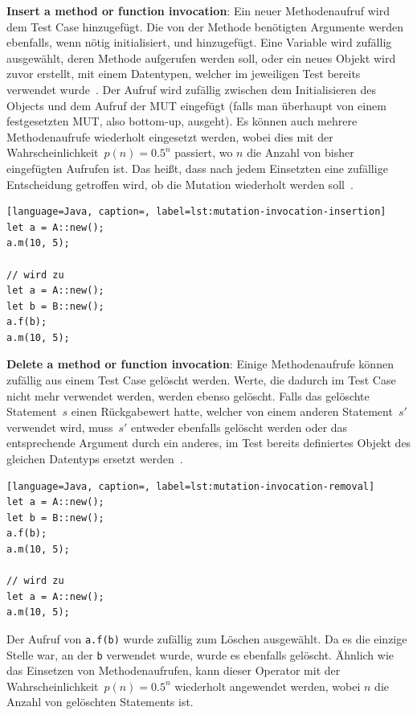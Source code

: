 \documentclass{article}
\begin{document}
\textbf{Insert a method or function invocation}: Ein neuer Methodenaufruf wird dem Test Case hinzugefügt. Die von der Methode benötigten Argumente werden ebenfalls, wenn nötig initialisiert, und hinzugefügt. Eine Variable wird zufällig ausgewählt, deren Methode aufgerufen werden soll, oder ein neues Objekt wird zuvor erstellt, mit einem Datentypen, welcher im jeweiligen Test bereits verwendet wurde~\cite{Fraser2012}. Der Aufruf wird zufällig zwischen dem Initialisieren des Objects und dem Aufruf der \ac{MUT} eingefügt (falls man überhaupt von einem festgesetzten MUT, also bottom-up, ausgeht). Es können auch mehrere Methodenaufrufe wiederholt eingesetzt werden, wobei dies mit der Wahrscheinlichkeit~$p(n) = 0.5^n$ passiert, wo $n$ die Anzahl von bisher eingefügten Aufrufen ist. Das heißt, dass nach jedem Einsetzten eine zufällige Entscheidung getroffen wird, ob die Mutation wiederholt werden soll~\cite{Tonella2004}.
\begin{lstlisting}[language=Java, caption=, label=lst:mutation-invocation-insertion]
let a = A::new();
a.m(10, 5);

// wird zu 
let a = A::new();
let b = B::new();
a.f(b);
a.m(10, 5);
\end{lstlisting}

\textbf{Delete a method or function invocation}: Einige Methodenaufrufe können zufällig aus einem Test Case gelöscht werden. Werte, die dadurch im Test Case nicht mehr verwendet werden, werden ebenso gelöscht. Falls das gelöschte Statement~$s$ einen Rückgabewert hatte, welcher von einem anderen Statement~$s'$ verwendet wird, muss~$s'$ entweder ebenfalls gelöscht werden oder das entsprechende Argument durch ein anderes, im Test bereits definiertes Objekt des gleichen Datentyps ersetzt werden~\cite{Fraser2012}.
\begin{lstlisting}[language=Java, caption=, label=lst:mutation-invocation-removal]
let a = A::new();
let b = B::new();
a.f(b);
a.m(10, 5);

// wird zu 
let a = A::new();
a.m(10, 5);
\end{lstlisting}
Der Aufruf von \lstinline{a.f(b)} wurde zufällig zum Löschen ausgewählt. Da es die einzige Stelle war, an der \lstinline{b} verwendet wurde, wurde es ebenfalls gelöscht. Ähnlich wie das Einsetzen von Methodenaufrufen, kann dieser Operator mit der Wahrscheinlichkeit~$p(n) = 0.5^n$ wiederholt angewendet werden, wobei $n$ die Anzahl von gelöschten Statements ist. 
\end{document}
